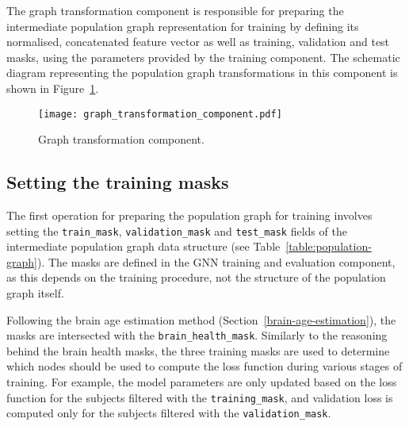 The graph transformation component is responsible for preparing the intermediate population graph representation for training by defining its normalised, concatenated feature vector as well as training, validation and test masks, using the parameters provided by the training component. The schematic diagram representing the population graph transformations in this component is shown in Figure~\ref{graph-transformation-component}.

\begin{figure}[h]
    \centering
    \texttt{[image: graph\_transformation\_component.pdf]}
    \caption{Graph transformation component.}\label{graph-transformation-component}
\end{figure}

\subsection{Setting the training masks}
\label{setting-training-masks}
The first operation for preparing the population graph for training involves setting the \texttt{train\_mask}, \texttt{validation\_mask} and \texttt{test\_mask} fields of the intermediate population graph data structure (see Table~\ref{table:population-graph}). The masks are defined in the GNN training and evaluation component, as this depends on the training procedure, not the structure of the population graph itself.

Following the brain age estimation method (Section~\ref{brain-age-estimation}), the masks are intersected with the \texttt{brain\_health\_mask}. Similarly to the reasoning behind the brain health masks, the three training masks are used to determine which nodes should be used to compute the loss function during various stages of training. For example, the model parameters are only updated based on the loss function for the subjects filtered with the \texttt{training\_mask}, and validation loss is computed only for the subjects filtered with the \texttt{validation\_mask}.

